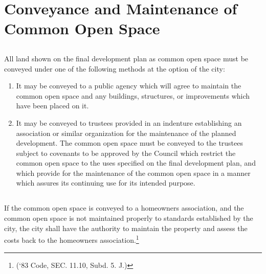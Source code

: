 \section{Conveyance and Maintenance of Common Open Space}
\subsection{}
All land shown on the final development plan as common open space must be conveyed under one of the following methods at the option of the city:
\begin{enumerate}[{\indent}1)]
    \item It may be conveyed to a public agency which will agree to maintain the common open space and any buildings, structures, or improvements which have been placed on it.
    \item It may be conveyed to trustees provided in an indenture establishing an association or similar organization for the maintenance of the planned development. The common open space must be conveyed to the trustees subject to covenants to be approved by the Council which restrict the common open space to the uses specified on the final development plan, and which provide for the maintenance of the common open space in a manner which assures its continuing use for its intended purpose.
\end{enumerate}
\subsection{}
If the common open space is conveyed to a homeowners association, and the common open space is not maintained properly to standards established by the city, the city shall have the authority to maintain the property and assess the costs back to the homeowners association.\footnote{(‘83 Code, SEC. 11.10, Subd. 5. J.)}
